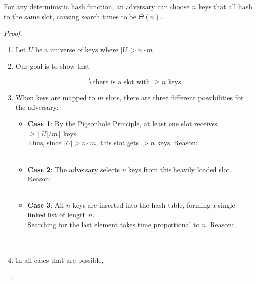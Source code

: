 \documentclass[11pt]{exam}
\begin{document}
	\newpage
	\begin{theorem}
		For any deterministic hash function, an adversary can choose $n$ keys that all hash to the same slot, causing search times to be $\Theta(n)$. 
	\end{theorem}
	\begin{proof}
		\begin{enumerate}
			\item Let $U$ be a universe of keys where $|U| > n \cdot m$
			\vs{2cm}
			\item Our goal is to show that 
			
			\begin{equation*}
				\hide{\text{there is a slot with } \ge n \text{ keys}}
			\end{equation*}
			
			\item When keys are mapped to $m$ slots, there are three different possibilities for the adversary:
			
			\begin{itemize}
				\item \textbf{Case 1}: By the Pigeonhole Principle, at least one slot receives $\ge \lceil |U| / m \rceil$ keys. \\
				
				Thus, since $|U| > n \cdot m$, this slot gets $> n$ keys. Reason: \\ \\
				
				\item \textbf{Case 2}: The adversary selects $n$ keys from this heavily loaded slot.\\
				
				Reason:  \\ \\ 
				
				\item \textbf{Case 3}: All $n$ keys are inserted into the hash table, forming a single linked list of length $n$. \\
				
				Searching for the last element takes time proportional to $n$. Reason:   \\ \\ \\
				
			\end{itemize}
			\item In all cases that are possible, 
		\end{enumerate}
		
		
	\end{proof}
\end{document}
